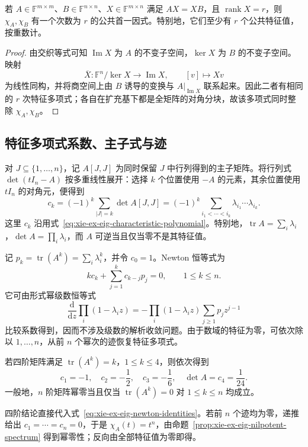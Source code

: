 \begin{proposition}
\label{prop:xie-ex-eig-intertwining}
若 $A\in\mathbb F^{m\times m}$、$B\in\mathbb F^{n\times n}$、$X\in\mathbb F^{m\times n}$ 满足 $AX=XB$，且 $\operatorname{rank}X=r$，则 $\chi_A,\chi_B$ 有一个次数为 $r$ 的公共首一因式。特别地，它们至少有 $r$ 个公共特征值，按重数计。
\end{proposition}
\begin{proof}
由交织等式可知 $\operatorname{Im}X$ 为 $A$ 的不变子空间，$\ker X$ 为 $B$ 的不变子空间。映射
\[
\overline X\colon\mathbb F^n/\ker X\longrightarrow\operatorname{Im}X,
\qquad [v]\longmapsto Xv
\]
为线性同构，并将商空间上由 $B$ 诱导的变换与 $A|_{\operatorname{Im}X}$ 联系起来。因此二者有相同的 $r$ 次特征多项式；各自在扩充基下都是全矩阵的对角分块，故该多项式同时整除 $\chi_A,\chi_B$。
\end{proof}

\subsection{特征多项式系数、主子式与迹}

对 $J\subseteq\{1,\ldots,n\}$，记 $A[J,J]$ 为同时保留 $J$ 中行列得到的主子矩阵。将行列式 $\det(tI_n-A)$ 按多重线性展开：选择 $k$ 个位置使用 $-A$ 的元素，其余位置使用 $tI_n$ 的对角元，便得到
\begin{equation}
c_k=(-1)^k\sum_{|J|=k}\det A[J,J]
=(-1)^k\sum_{i_1<\cdots<i_k}\lambda_{i_1}\cdots\lambda_{i_k}.
\label{eq:xie-ex-eig-principal-minors}
\end{equation}
这里 $c_k$ 沿用式~\eqref{eq:xie-ex-eig-characteristic-polynomial}。特别地，$\operatorname{tr}A=\sum_i\lambda_i$，$\det A=\prod_i\lambda_i$，而 $A$ 可逆当且仅当零不是其特征值。

记 $p_k=\operatorname{tr}(A^k)=\sum_i\lambda_i^k$，并令 $c_0=1$。Newton 恒等式为
\begin{equation}
kc_k+\sum_{j=1}^k c_{k-j}p_j=0,\qquad 1\le k\le n.
\label{eq:xie-ex-eig-newton-identities}
\end{equation}
它可由形式幂级数恒等式
\[
\frac{\mathrm d}{\mathrm dz}\prod_i(1-\lambda_i z)
=-\prod_i(1-\lambda_i z)\sum_{j\ge1}p_jz^{j-1}
\]
比较系数得到，因而不涉及级数的解析收敛问题。由于数域的特征为零，可依次除以 $1,\ldots,n$，从前 $n$ 个幂次的迹恢复特征多项式。

\begin{example}
若四阶矩阵满足 $\operatorname{tr}(A^k)=k$，$1\le k\le4$，则依次得到
\[
c_1=-1,\quad c_2=-\frac12,\quad c_3=-\frac16,\quad
\det A=c_4=\frac1{24}.
\]
一般地，$n$ 阶矩阵幂零当且仅当 $\operatorname{tr}(A^k)=0$ 对 $1\le k\le n$ 均成立。
\end{example}
\begin{solve}
四阶结论直接代入式~\eqref{eq:xie-ex-eig-newton-identities}。若前 $n$ 个迹均为零，递推给出 $c_1=\cdots=c_n=0$，于是 $\chi_A(t)=t^n$，由命题~\ref{prop:xie-ex-eig-nilpotent-spectrum} 得到幂零性；反向由全部特征值为零即得。
\end{solve}


